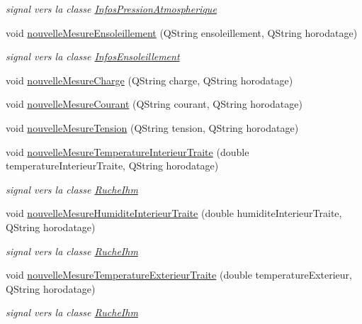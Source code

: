 \begin{DoxyCompactItemize}
\begin{DoxyCompactList}\small\item\em signal vers la classe \hyperlink{class_infos_pression_atmospherique}{Infos\+Pression\+Atmospherique} \end{DoxyCompactList}\item 
void \hyperlink{class_ruche_aa9eaf4dd1b60e525c7d1bb5319130ce1}{nouvelle\+Mesure\+Ensoleillement} (Q\+String ensoleillement, Q\+String horodatage)
\begin{DoxyCompactList}\small\item\em signal vers la classe \hyperlink{class_infos_ensoleillement}{Infos\+Ensoleillement} \end{DoxyCompactList}\item 
void \hyperlink{class_ruche_a49ac0c627ecac39c969403db1495711f}{nouvelle\+Mesure\+Charge} (Q\+String charge, Q\+String horodatage)
\item 
void \hyperlink{class_ruche_a46d8191444302b02a52d1128c5650730}{nouvelle\+Mesure\+Courant} (Q\+String courant, Q\+String horodatage)
\item 
void \hyperlink{class_ruche_aa3fd352b343fcf780787aeb7e42935ef}{nouvelle\+Mesure\+Tension} (Q\+String tension, Q\+String horodatage)
\item 
void \hyperlink{class_ruche_aa63b4fd7c695ef77c9ff4b684ed8ce91}{nouvelle\+Mesure\+Temperature\+Interieur\+Traite} (double temperature\+Interieur\+Traite, Q\+String horodatage)
\begin{DoxyCompactList}\small\item\em signal vers la classe \hyperlink{class_ruche_ihm}{Ruche\+Ihm} \end{DoxyCompactList}\item 
void \hyperlink{class_ruche_abb16e6c9eef6640a3a216f856cf8d0f5}{nouvelle\+Mesure\+Humidite\+Interieur\+Traite} (double humidite\+Interieur\+Traite, Q\+String horodatage)
\begin{DoxyCompactList}\small\item\em signal vers la classe \hyperlink{class_ruche_ihm}{Ruche\+Ihm} \end{DoxyCompactList}\item 
void \hyperlink{class_ruche_a5b85ea246b58776a96e2ff7bd701daa7}{nouvelle\+Mesure\+Temperature\+Exterieur\+Traite} (double temperature\+Exterieur, Q\+String horodatage)
\begin{DoxyCompactList}\small\item\em signal vers la classe \hyperlink{class_ruche_ihm}{Ruche\+Ihm} \end{DoxyCompactList}\item 

\end{DoxyCompactItemize}

